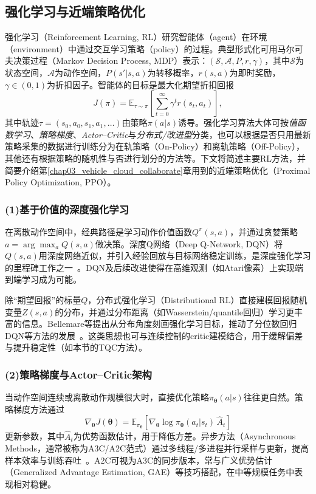   \subsection{强化学习与近端策略优化}  
  \label{sec:rl_overview_ppo}
  强化学习（Reinforcement Learning, RL）研究智能体（agent）在环境（environment）中通过交互学习策略（policy）的过程。典型形式化可用马尔可夫决策过程（Markov Decision Process, MDP）表示：$(\mathcal{S},\mathcal{A},P,r,\gamma)$，其中$\mathcal{S}$为状态空间，$\mathcal{A}$为动作空间，$P(s'|s,a)$为转移概率，$r(s,a)$为即时奖励，$\gamma\in(0,1)$为折扣因子。智能体的目标是最大化期望折扣回报
  \begin{equation}
  J(\pi)=\mathbb{E}_{\tau\sim\pi}\left[\sum_{t=0}^{\infty}\gamma^t r(s_t,a_t)\right],
  \end{equation}
  其中轨迹$\tau=(s_0,a_0,s_1,a_1,\dots)$由策略$\pi(a|s)$诱导。强化学习算法大体可按\emph{值函数学习}、\emph{策略梯度}、\emph{Actor--Critic}与\emph{分布式/改进型}分类，也可以根据是否只用最新策略采集的数据进行训练分为在轨策略（On-Policy）和离轨策略（Off-Policy），其他还有根据策略的随机性与否进行划分的方法等。下文将简述主要RL方法，并简要介绍第\ref{chap03_vehicle_cloud_collaborate}章用到的近端策略优化（Proximal Policy Optimization, PPO）。

  \subsubsection*{(1)基于价值的深度强化学习}
    在离散动作空间中，经典路径是学习动作价值函数$Q^\pi(s,a)$，并通过贪婪策略$ a=\arg\max_a Q(s,a)$做决策。深度Q网络（Deep Q-Network, DQN）将$Q(s,a)$用深度网络近似，并引入经验回放与目标网络稳定训练，是深度强化学习的里程碑工作之一~\cite{DQN_2013}。DQN及后续改进使得在高维观测（如Atari像素）上实现端到端学习成为可能。

    除“期望回报”的标量$Q$，分布式强化学习（Distributional RL）直接建模回报随机变量$Z(s,a)$的分布，并通过分布距离（如Wasserstein/quantile回归）学习更丰富的信息。Bellemare等提出从分布角度刻画强化学习目标，推动了分位数回归DQN等方法的发展~\cite{QR_DQN_2017}。这类思想也可与连续控制的critic建模结合，用于缓解偏差与提升稳定性（如本节的TQC方法）。

  \subsubsection*{(2)策略梯度与Actor--Critic架构}
    当动作空间连续或离散动作规模很大时，直接优化策略$\pi_\bm{\theta}(a|s)$往往更自然。策略梯度方法通过
    \begin{equation}
    \nabla_\bm{\theta} J(\bm{\theta})=\mathbb{E}_{\pi_\bm{\theta}}\left[\nabla_\bm{\theta} \log \pi_\bm{\theta}(a_t|s_t)\, \hat{A}_t \right]
    \end{equation}
    更新参数，其中$\hat{A}_t$为优势函数估计，用于降低方差。异步方法（Asynchronous Methods，通常被称为A3C/A2C范式）通过多线程/多进程并行采样与更新，提高样本效率与训练吞吐~\cite{A2C_2016}。A2C可视为A3C的同步版本，常与广义优势估计（Generalized Advantage Estimation, GAE）等技巧搭配，在中等规模任务中表现相对稳健。


